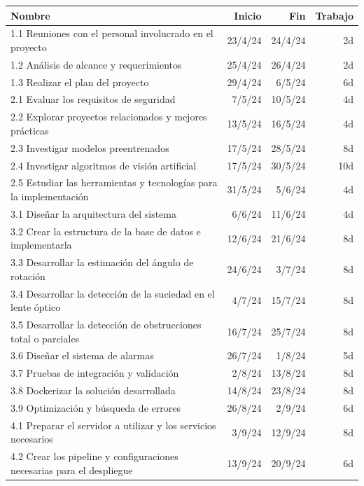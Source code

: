 \documentclass[
11pt, %
]{charter}
\begin{document}
\begin{table}[ht]
\begin{tabularx}{\linewidth}{|X|r|r|r|}
\hline
\rowcolor[HTML]{C0C0C0} 
Nombre & Inicio & Fin & Trabajo \\ \hline
1.1 Reuniones con el personal involucrado en el proyecto & 23/4/24 & 24/4/24 & 2d \\ \hline
1.2 Análisis de alcance y requerimientos & 25/4/24 & 26/4/24 & 2d \\ \hline
1.3 Realizar el plan del proyecto & 29/4/24 & 6/5/24 & 6d \\ \hline
2.1 Evaluar los requisitos de seguridad & 7/5/24 & 10/5/24 & 4d \\ \hline
2.2 Explorar proyectos relacionados y mejores prácticas & 13/5/24 & 16/5/24 & 4d \\ \hline
2.3 Investigar modelos preentrenados & 17/5/24 & 28/5/24 & 8d \\ \hline
2.4 Investigar algoritmos de visión artificial & 17/5/24 & 30/5/24 & 10d \\ \hline
2.5 Estudiar las herramientas y tecnologías para la implementación & 31/5/24 & 5/6/24 & 4d \\ \hline
3.1 Diseñar la arquitectura del sistema & 6/6/24 & 11/6/24 & 4d \\ \hline
3.2 Crear la estructura de la base de datos e implementarla & 12/6/24 & 21/6/24 & 8d \\ \hline
3.3 Desarrollar la estimación del ángulo de rotación & 24/6/24 & 3/7/24 & 8d \\ \hline
3.4 Desarrollar la detección de la suciedad en el lente óptico & 4/7/24 & 15/7/24 & 8d \\ \hline
3.5 Desarrollar la detección de obstrucciones total o parciales & 16/7/24 & 25/7/24 & 8d \\ \hline
3.6 Diseñar el sistema de alarmas & 26/7/24 & 1/8/24 & 5d \\ \hline
3.7 Pruebas de integración y validación & 2/8/24 & 13/8/24 & 8d \\ \hline
3.8 Dockerizar la solución desarrollada & 14/8/24 & 23/8/24 & 8d \\ \hline
3.9 Optimización y búsqueda de errores & 26/8/24 & 2/9/24 & 6d \\ \hline
4.1 Preparar el servidor a utilizar y los servicios necesarios & 3/9/24 & 12/9/24 & 8d \\ \hline
4.2 Crear los pipeline y configuraciones necesarias para el despliegue & 13/9/24 & 20/9/24 & 6d \\ \hline

\end{tabularx}
\end{table}
\end{document}
